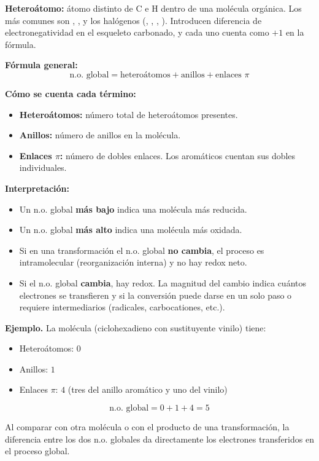 \textbf{Heteroátomo:} átomo distinto de C e H dentro de una molécula 
orgánica. Los más comunes son , ,  y los halógenos 
(, , , ). Introducen diferencia de 
electronegatividad en el esqueleto carbonado, y cada uno cuenta como $+1$ 
en la fórmula.

\textbf{Fórmula general:}
\begin{equation}
\text{n.o. global} = \text{heteroátomos} + \text{anillos} + \text{enlaces } \pi
\end{equation}

\textbf{Cómo se cuenta cada término:}
\begin{itemize}
    \item \textbf{Heteroátomos:} número total de heteroátomos presentes.
    \item \textbf{Anillos:} número de anillos en la molécula.
    \item \textbf{Enlaces $\pi$:} número de dobles enlaces. Los aromáticos cuentan sus dobles individuales.
\end{itemize}

\textbf{Interpretación:}
\begin{itemize}
    \item Un n.o. global \textbf{más bajo} indica una molécula más reducida.
    \item Un n.o. global \textbf{más alto} indica una molécula más oxidada.
    \item Si en una transformación el n.o. global \textbf{no cambia}, el proceso 
    es intramolecular (reorganización interna) y no hay redox neto.
    \item Si el n.o. global \textbf{cambia}, hay redox. La magnitud del cambio 
    indica cuántos electrones se transfieren y si la conversión puede darse 
    en un solo paso o requiere intermediarios (radicales, carbocationes, etc.).
\end{itemize}

\textbf{Ejemplo.} La molécula  (ciclohexadieno 
con sustituyente vinilo) tiene:
\begin{itemize}
    \item Heteroátomos: $0$
    \item Anillos: $1$
    \item Enlaces $\pi$: $4$ (tres del anillo aromático y uno del vinilo)
\end{itemize}
\[
\text{n.o. global} = 0 + 1 + 4 = 5
\]

Al comparar con otra molécula o con el producto de una transformación, la 
diferencia entre los dos n.o. globales da directamente los electrones 
transferidos en el proceso global.

